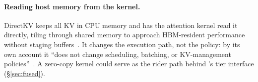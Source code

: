 

\paragraph{Reading host memory from the kernel.} DirectKV keeps all KV in
CPU memory and has the attention kernel read it directly, tiling through
shared memory to approach HBM-resident performance without staging
buffers~\cite{directkv}. It changes the execution path, not the policy: by its
own account it ``does not change scheduling, batching, or KV-management
policies''~\cite{directkv}. A zero-copy kernel could serve as the rider path
behind \sysname{}'s tier interface (\S\ref{sec:fused}).

